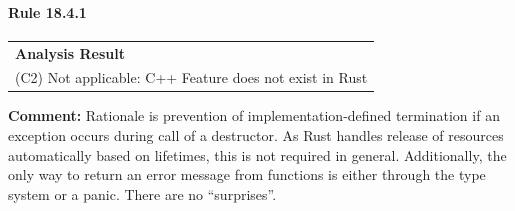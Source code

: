 \paragraph{Rule 18.4.1}
\begin{longtable}{p{13cm}}
\textbf{Analysis Result} \\
(C2) Not applicable: C++ Feature does not exist in Rust \\
\end{longtable}
\textbf{Comment:} Rationale is prevention of implementation-defined termination if an exception occurs during call of a destructor. As Rust handles release of resources automatically based on lifetimes, this is not required in general. Additionally, the only way to return an error message from functions is either through the type system or a panic. There are no ``surprises''. \\
